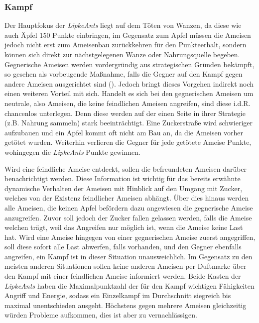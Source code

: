 \subsubsection{Kampf}
Der Hauptfokus der \textit{LipkeAnts} liegt auf dem Töten von Wanzen, da diese wie auch Äpfel 150 Punkte einbringen, im Gegensatz zum Apfel müssen die Ameisen jedoch nicht erst zum Ameisenbau zurückkehren für den Punkteerhalt, sondern können sich direkt zur nächstgelegenen Wanze oder Nahrungsquelle begeben. Gegnerische Ameisen werden vordergründig aus strategischen Gründen bekämpft, so gesehen als vorbeugende Maßnahme, falls die Gegner auf den Kampf gegen andere Ameisen ausgerichtet sind (). Jedoch bringt dieses Vorgehen indirekt noch einen weiteren Vorteil mit sich. Handelt es sich bei den gegnerischen Ameisen um neutrale, also Ameisen, die keine feindlichen Ameisen angreifen, sind diese i.d.R. chancenlos unterlegen. Denn diese werden auf der einen Seite in ihrer Strategie (z.B. Nahrung sammeln) stark beeinträchtigt. Eine Zuckerstraße wird schwieriger aufzubauen und ein Apfel kommt oft nicht am Bau an, da die Ameisen vorher getötet wurden. Weiterhin verlieren die Gegner für jede getötete Ameise Punkte, wohingegen die \textit{LipkeAnts} Punkte gewinnen.

Wird eine feindliche Ameise entdeckt, sollen die befreundeten Ameisen darüber benachrichtigt werden. Diese Information ist wichtig für das bereits erwähnte dynamische Verhalten der Ameisen mit Hinblick auf den Umgang mit Zucker, welches von der Existenz feindlicher Ameisen abhängt. Über dies hinaus werden alle Ameisen, die keinen Apfel befördern dazu angewiesen die gegnerische Ameise anzugreifen. Zuvor soll jedoch der Zucker fallen gelassen werden, falls die Ameise welchen trägt, weil das Angreifen nur möglich ist, wenn die Ameise keine Last hat. Wird eine Ameise hingegen von einer gegnerischen Ameise zuerst angegriffen, soll diese sofort alle Last abwerfen, falls vorhanden, und den Gegner ebenfalls angreifen, ein Kampf ist in dieser Situation unausweichlich. Im Gegensatz zu den meisten anderen Situationen sollen keine anderen Ameisen per Duftmarke über den Kampf mit einer feindlichen Ameise informiert werden. Beide Kasten der \textit{LipkeAnts} haben die Maximalpunktzahl der für den Kampf wichtigen Fähigkeiten Angriff und Energie, sodass ein Einzelkampf im Durchschnitt siegreich bis maximal unentschieden ausgeht. Höchstens gegen mehrere Ameisen gleichzeitig würden Probleme aufkommen, dies ist aber zu vernachlässigen. 

